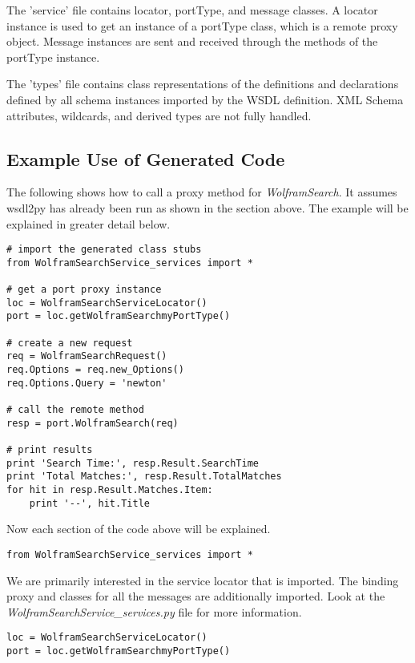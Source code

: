 The 'service' file contains locator, portType, and message classes.  
A locator instance is used to get an instance of a portType class, 
which is a remote proxy object. Message instances are sent and received 
through the methods of the portType instance.

The 'types' file contains class representations of the definitions and
declarations defined by all schema instances imported by the WSDL definition.
XML Schema attributes, wildcards, and derived types are not fully
handled.

\subsection{Example Use of Generated Code}

The following shows how to call a proxy method for {\it WolframSearch}.  It
assumes wsdl2py has already been run as shown in the section above.  The example
will be explained in greater detail below.

\begin{verbatim}
# import the generated class stubs
from WolframSearchService_services import *

# get a port proxy instance
loc = WolframSearchServiceLocator()
port = loc.getWolframSearchmyPortType()

# create a new request
req = WolframSearchRequest()
req.Options = req.new_Options()
req.Options.Query = 'newton'

# call the remote method
resp = port.WolframSearch(req)

# print results
print 'Search Time:', resp.Result.SearchTime
print 'Total Matches:', resp.Result.TotalMatches
for hit in resp.Result.Matches.Item:
    print '--', hit.Title
\end{verbatim}

Now each section of the code above will be explained.

\begin{verbatim}
from WolframSearchService_services import *
\end{verbatim}

We are primarily interested in the service locator that is imported.  The 
binding proxy and classes for all the messages are additionally imported.
Look at the {\it WolframSearchService_services.py} file for more information.

\begin{verbatim}
loc = WolframSearchServiceLocator()
port = loc.getWolframSearchmyPortType()
\end{verbatim}

